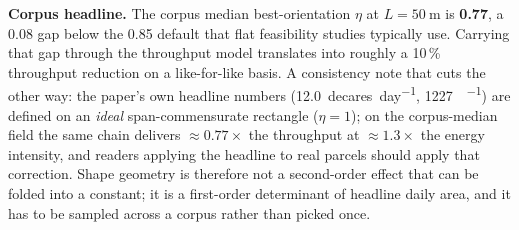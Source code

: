 \documentclass[11pt,a4paper]{article}
\begin{document}
\textbf{Corpus headline.} The corpus median best-orientation $\eta$ at $L = \SI{50}{\meter}$ is \textbf{0.77}, a 0.08 gap below the 0.85 default that flat feasibility studies typically use. Carrying that gap through the throughput model translates into roughly a 10\,\% throughput reduction on a like-for-like basis. A consistency note that cuts the other way: the paper's own headline numbers (\SI{12.0}{decares\per day}, \SI{1227}{\Wh\per\decare}) are defined on an \emph{ideal} span-commensurate rectangle ($\eta = 1$); on the corpus-median field the same chain delivers ${\approx}0.77\times$ the throughput at ${\approx}1.3\times$ the energy intensity, and readers applying the headline to real parcels should apply that correction. Shape geometry is therefore not a second-order effect that can be folded into a constant; it is a first-order determinant of headline daily area, and it has to be sampled across a corpus rather than picked once.
\end{document}
